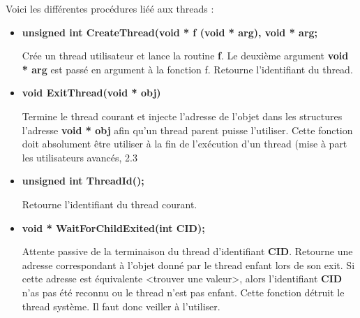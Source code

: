 \documentclass{article}
\begin{document}
Voici les différentes procédures liéé aux threads :
\begin{itemize}

    \item 
    \textbf{unsigned int CreateThread(void * f (void * arg), void * arg;}
    
    Crée un thread utilisateur et lance la routine \textbf{f}. Le deuxième argument 
    \textbf{void * arg} est passé en argument à la fonction f.
    Retourne l'identifiant du thread.
   
   \item 
   \textbf{void ExitThread(void * obj)} 
   
   Termine le thread courant et injecte l'adresse de l'objet dans les structures l'adresse \textbf{void * obj} afin qu'un thread parent puisse l'utiliser. Cette fonction doit absolument être utiliser à la fin de l'exécution d'un thread (mise à part les utilisateurs avancés, 2.3
   
   \item 
   \textbf{unsigned int ThreadId();}
   
  Retourne l'identifiant du thread courant.   
   
   \item
   \textbf{void * WaitForChildExited(int CID);} 
   
   Attente passive de la terminaison du thread d'identifiant \textbf{CID}. Retourne une adresse correspondant à l'objet donné par le thread enfant lors de son exit. Si cette adresse est équivalente <trouver une valeur>, alors l'identifiant \textbf{CID} n'as pas été reconnu ou le thread n'est pas enfant.
   Cette fonction détruit le thread système. Il faut donc veiller à l'utiliser.
   
    
\end{itemize}
\end{document}

